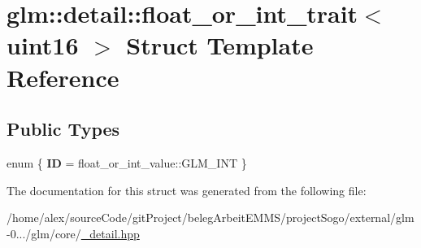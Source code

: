 \hypertarget{structglm_1_1detail_1_1float__or__int__trait_3_01uint16_01_4}{\section{glm\-:\-:detail\-:\-:float\-\_\-or\-\_\-int\-\_\-trait$<$ uint16 $>$ Struct Template Reference}
\label{structglm_1_1detail_1_1float__or__int__trait_3_01uint16_01_4}
}
\subsection*{Public Types}
\begin{DoxyCompactItemize}
\item 
enum \{ {\bfseries I\-D} = float\-\_\-or\-\_\-int\-\_\-value\-:\-:G\-L\-M\-\_\-\-I\-N\-T
 \}
\end{DoxyCompactItemize}


The documentation for this struct was generated from the following file\-:\begin{DoxyCompactItemize}
\item 
/home/alex/source\-Code/git\-Project/beleg\-Arbeit\-E\-M\-M\-S/project\-Sogo/external/glm-\/0.../glm/core/\hyperlink{__detail_8hpp}{\-\_\-detail.\-hpp}\end{DoxyCompactItemize}
